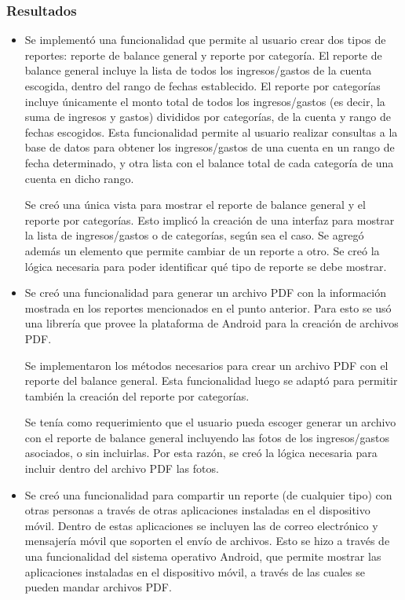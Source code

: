 \subsubsection{Resultados}
\begin{itemize}
\item Se implementó una funcionalidad que permite al usuario crear dos tipos de reportes: reporte de balance general y reporte por categoría. El reporte de balance general incluye la lista de todos los ingresos/gastos de la cuenta escogida, dentro del rango de fechas establecido. El reporte por categorías incluye únicamente el monto total de todos los ingresos/gastos (es decir, la suma de ingresos y gastos) divididos por categorías, de la cuenta y rango de fechas escogidos. Esta funcionalidad permite al usuario realizar consultas a la base de datos para obtener los ingresos/gastos de una cuenta en un rango de fecha determinado, y otra lista con el balance total de cada categoría de una cuenta en dicho rango.

Se creó una única vista para mostrar el reporte de balance general y el reporte por categorías. Esto implicó la creación de una interfaz para mostrar la lista de ingresos/gastos o de categorías, según sea el caso. Se agregó además un elemento que permite cambiar de un reporte a otro. Se creó la lógica necesaria para poder identificar qué tipo de reporte se debe mostrar.
\item Se creó una funcionalidad para generar un archivo PDF con la información mostrada en los reportes mencionados en el punto anterior.  Para esto se usó una librería que provee la plataforma de Android para la creación de archivos PDF.  

Se implementaron los métodos necesarios para crear un archivo PDF con el reporte del balance general. Esta funcionalidad luego se adaptó para permitir también la creación del reporte por categorías. %

Se tenía como requerimiento que el usuario pueda escoger generar un archivo con el reporte de balance general incluyendo las fotos de los ingresos/gastos asociados, o sin incluirlas. Por esta razón, se creó la lógica necesaria para incluir dentro del archivo PDF las fotos.
\item Se creó una funcionalidad para compartir un reporte (de cualquier tipo) con otras personas a través de otras aplicaciones instaladas en el dispositivo móvil. Dentro de estas aplicaciones se incluyen las de correo electrónico y mensajería móvil que soporten el envío de archivos. Esto se hizo a través de una funcionalidad del sistema operativo Android, que permite mostrar las aplicaciones instaladas en el dispositivo móvil, a través de las cuales se pueden mandar archivos PDF.
\end{itemize}
